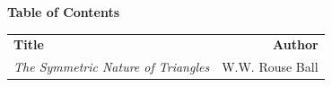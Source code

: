 \documentclass{report}
\begin{document}
\center \Large \textbf{Table of Contents}\\[.5in]
\normalsize
\begin{tabular}{lr}
\textbf{Title} & \textbf{Author}\\[.25in]
\emph{The Symmetric Nature of Triangles} & W.W. Rouse Ball \\[.25in]
\end{tabular}


%
%
%
%
%
%
%
%
%
%
%
\end{document}
